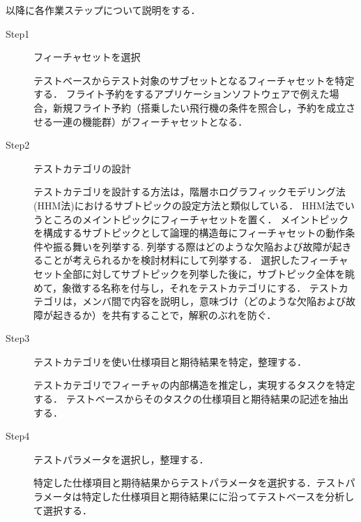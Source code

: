 以降に各作業ステップについて説明をする．

\begin{description}
\item[Step1] フィーチャセットを選択

テストベースからテスト対象のサブセットとなるフィーチャセットを特定する．
フライト予約をするアプリケーションソフトウェアで例えた場合，新規フライト予約（搭乗したい飛行機の条件を照合し，予約を成立させる一連の機能群）がフィーチャセットとなる．

\item[Step2] テストカテゴリの設計

テストカテゴリを設計する方法は，階層ホログラフィックモデリング法(HHM法)におけるサブトピックの設定方法と類似している\cite{HHM2002}．
HHM法でいうところのメイントピックにフィーチャセットを置く．
メイントピックを構成するサブトピックとして論理的構造毎にフィーチャセットの動作条件や振る舞いを列挙する.
列挙する際はどのような欠陥および故障が起きることが考えられるかを検討材料にして列挙する．
選択したフィーチャセット全部に対してサブトピックを列挙した後に，サブトピック全体を眺めて，象徴する名称を付与し，それをテストカテゴリにする．
テストカテゴリは，メンバ間で内容を説明し，意味づけ（どのような欠陥および故障が起きるか）を共有することで，解釈のぶれを防ぐ．


\item[Step3] テストカテゴリを使い仕様項目と期待結果を特定，整理する．

テストカテゴリでフィーチャの内部構造を推定し，実現するタスクを特定する．
テストベースからそのタスクの仕様項目と期待結果の記述を抽出する．


\item[Step4] テストパラメータを選択し，整理する．

特定した仕様項目と期待結果からテストパラメータを選択する．テストパラメータは特定した仕様項目と期待結果にに沿ってテストベースを分析して選択する．

\end{description}



